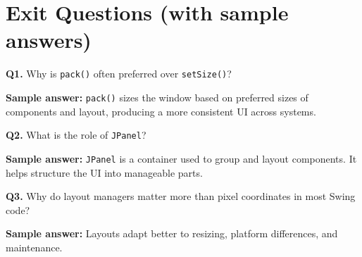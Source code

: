 \documentclass[11pt]{article}
\begin{document}
\section{Exit Questions (with sample answers)}
\textbf{Q1.} Why is \texttt{pack()} often preferred over \texttt{setSize()}?\par
\textbf{Sample answer:} \texttt{pack()} sizes the window based on preferred sizes of components and layout, producing a more consistent UI across systems.

\vspace{0.6em}
\textbf{Q2.} What is the role of \texttt{JPanel}?\par
\textbf{Sample answer:} \texttt{JPanel} is a container used to group and layout components. It helps structure the UI into manageable parts.

\vspace{0.6em}
\textbf{Q3.} Why do layout managers matter more than pixel coordinates in most Swing code?\par
\textbf{Sample answer:} Layouts adapt better to resizing, platform differences, and maintenance.
\end{document}
